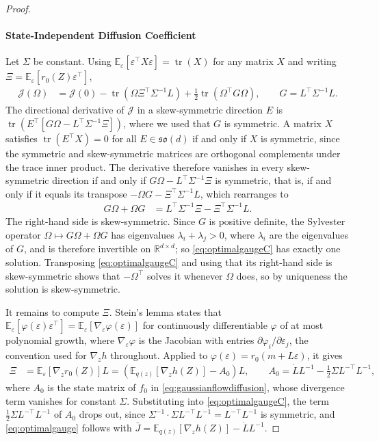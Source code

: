 \documentclass{article} %
\newcommand{\priordrift}{h}
\newcommand{\postdrift}{f}
\newcommand{\gauge}{\Omega}
\newcommand{\tr}{\operatorname{tr}}
\newcommand{\skewset}{\mathfrak{so}}
\newcommand{\E}{\mathbb{E}}
\newcommand{\reals}{\mathbb{R}}
\begin{document}
\begin{proof}
\paragraph{State-Independent Diffusion Coefficient}
Let $\Sigma$ be constant. Using $\E_\varepsilon[\varepsilon^\top X \varepsilon] = \tr(X)$ for any matrix $X$ and writing $\Xi = \E_\varepsilon[r_0(Z) \varepsilon^\top]$,
\begin{align*}
    \mathcal{J}(\gauge) &= \mathcal{J}(0) - \tr\left( \gauge \Xi^\top \Sigma^{-1} L \right) + \frac{1}{2} \tr\left( \gauge^\top G \gauge \right), \qquad G = L^\top \Sigma^{-1} L.
\end{align*}
The directional derivative of $\mathcal{J}$ in a skew-symmetric direction $E$ is $\tr( E^\top [ G \gauge - L^\top \Sigma^{-1} \Xi ] )$, where we used that $G$ is symmetric. A matrix $X$ satisfies $\tr(E^\top X) = 0$ for all $E \in \skewset(d)$ if and only if $X$ is symmetric, since the symmetric and skew-symmetric matrices are orthogonal complements under the trace inner product. The derivative therefore vanishes in every skew-symmetric direction if and only if $G \gauge - L^\top \Sigma^{-1} \Xi$ is symmetric, that is, if and only if it equals its transpose $-\gauge G - \Xi^\top \Sigma^{-1} L$, which rearranges to
\begin{align}
    G \gauge + \gauge G &= L^\top \Sigma^{-1} \Xi - \Xi^\top \Sigma^{-1} L. \label{eq:optimalgaugeC}
\end{align}
The right-hand side is skew-symmetric. Since $G$ is positive definite, the Sylvester operator $\gauge \mapsto G \gauge + \gauge G$ has eigenvalues $\lambda_i + \lambda_j > 0$, where $\lambda_i$ are the eigenvalues of $G$, and is therefore invertible on $\reals^{d \times d}$; so \cref{eq:optimalgaugeC} has exactly one solution. Transposing \cref{eq:optimalgaugeC} and using that its right-hand side is skew-symmetric shows that $-\gauge^\top$ solves it whenever $\gauge$ does, so by uniqueness the solution is skew-symmetric.

It remains to compute $\Xi$. Stein's lemma states that $\E_\varepsilon[\varphi(\varepsilon) \varepsilon^\top] = \E_\varepsilon[\nabla_\varepsilon \varphi(\varepsilon)]$ for continuously differentiable $\varphi$ of at most polynomial growth, where $\nabla_\varepsilon \varphi$ is the Jacobian with entries $\partial \varphi_i / \partial \varepsilon_j$, the convention used for $\nabla_z \priordrift$ throughout. Applied to $\varphi(\varepsilon) = r_0(m + L \varepsilon)$, it gives
\begin{align*}
    \Xi &= \E_\varepsilon\left[\nabla_z r_0(Z)\right] L = \left( \E_{q(z)}\left[\nabla_z \priordrift(Z)\right] - A_0 \right) L, \qquad A_0 = \dot L L^{-1} - \frac{1}{2} \Sigma L^{-\top} L^{-1},
\end{align*}
where $A_0$ is the state matrix of $\postdrift_0$ in \cref{eq:gaussianflowdiffusion}, whose divergence term vanishes for constant $\Sigma$. Substituting into \cref{eq:optimalgaugeC}, the term $\frac{1}{2} \Sigma L^{-\top} L^{-1}$ of $A_0$ drops out, since $\Sigma^{-1} \cdot \Sigma L^{-\top} L^{-1} = L^{-\top} L^{-1}$ is symmetric, and \cref{eq:optimalgauge} follows with $\bar J = \E_{q(z)}[\nabla_z \priordrift(Z)] - \dot L L^{-1}$.
\end{proof}
\end{document}

